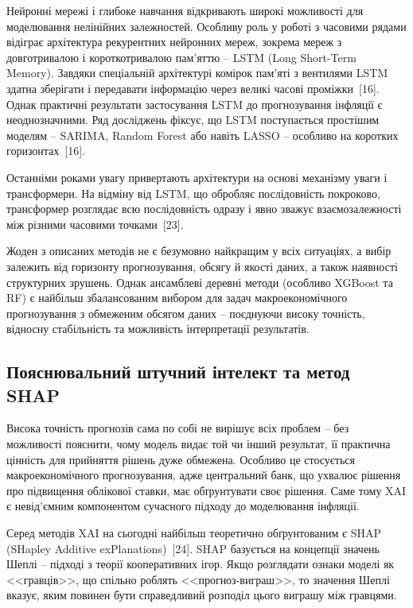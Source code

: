 \documentclass{bachelor_thesis}
\begin{document}
Нейронні мережі і глибоке навчання відкривають широкі можливості для моделювання нелінійних залежностей. Особливу роль у роботі з часовими рядами відіграє архітектура рекурентних нейронних мереж, зокрема мереж з довготривалою і короткотривалою пам'яттю -- LSTM (Long Short-Term Memory). Завдяки спеціальній архітектурі комірок пам'яті з вентилями LSTM здатна зберігати і передавати інформацію через великі часові проміжки~[16]. Однак практичні результати застосування LSTM до прогнозування інфляції є неоднозначними. Ряд досліджень фіксує, що LSTM поступається простішим моделям -- SARIMA, Random Forest або навіть LASSO -- особливо на коротких горизонтах~[16].

Останніми роками увагу привертають архітектури на основі механізму уваги і трансформери. На відміну від LSTM, що обробляє послідовність покроково, трансформер розглядає всю послідовність одразу і явно зважує взаємозалежності між різними часовими точками~[23].

Жоден з описаних методів не є безумовно найкращим у всіх ситуаціях, а вибір залежить від горизонту прогнозування, обсягу й якості даних, а також наявності структурних зрушень. Однак ансамблеві деревні методи (особливо XGBoost та RF) є найбільш збалансованим вибором для задач макроекономічного прогнозування з обмеженим обсягом даних -- поєднуючи високу точність, відносну стабільність та можливість інтерпретації результатів.

\subsection{Пояснювальний штучний інтелект та метод SHAP}

Висока точність прогнозів сама по собі не вирішує всіх проблем -- без можливості пояснити, чому модель видає той чи інший результат, її практична цінність для прийняття рішень дуже обмежена. Особливо це стосується макроекономічного прогнозування, адже центральний банк, що ухвалює рішення про підвищення облікової ставки, має обґрунтувати своє рішення. Саме тому XAI є невід'ємним компонентом сучасного підходу до моделювання інфляції.

Серед методів XAI на сьогодні найбільш теоретично обґрунтованим є SHAP (SHapley Additive exPlanations)~[24]. SHAP базується на концепції значень Шеплі -- підході з теорії кооперативних ігор. Якщо розглядати ознаки моделі як <<гравців>>, що спільно роблять <<прогноз-виграш>>, то значення Шеплі вказує, яким повинен бути справедливий розподіл цього виграшу між гравцями.
\end{document}
